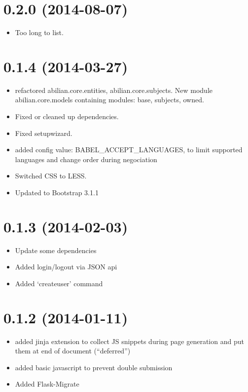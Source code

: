 \documentclass[a4paper,12pt,english]{sphinxmanual}
\begin{document}
\section{0.2.0 (2014-08-07)}
\label{changelog:id9}\begin{itemize}
\item {} 
Too long to list.

\end{itemize}


\section{0.1.4 (2014-03-27)}
\label{changelog:id10}\begin{itemize}
\item {} 
refactored abilian.core.entities, abilian.core.subjects. New module
abilian.core.models containing modules: base, subjects, owned.

\item {} 
Fixed or cleaned up dependencies.

\item {} 
Fixed setupwizard.

\item {} 
added config value: BABEL\_ACCEPT\_LANGUAGES, to limit supported languages and
change order during negociation

\item {} 
Switched CSS to LESS.

\item {} 
Updated to Bootstrap 3.1.1

\end{itemize}


\section{0.1.3 (2014-02-03)}
\label{changelog:id11}\begin{itemize}
\item {} 
Update some dependencies

\item {} 
Added login/logout via JSON api

\item {} 
Added `createuser' command

\end{itemize}


\section{0.1.2 (2014-01-11)}
\label{changelog:id12}\begin{itemize}
\item {} 
added jinja extension to collect JS snippets during page generation and put
them at end of document (``deferred'')

\item {} 
added basic javascript to prevent double submission

\item {} 
Added Flask-Migrate

\end{itemize}
\end{document}
